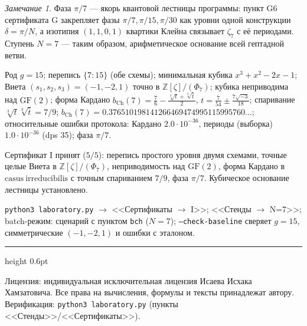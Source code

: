 \documentclass[11pt,a4paper]{article}
\theoremstyle{plain}
\theoremstyle{definition}
\theoremstyle{remark}
\newtheorem{remark}[theorem]{Замечание}
\newcommand{\ZZ}{\mathbb{Z}}
\begin{document}
\begin{remark}
Фаза $\pi/7$ --- якорь квантовой лестницы программы: пункт G6
сертификата G закрепляет фазы $\pi/7,\pi/15,\pi/30$ как уровни
одной конструкции $\delta=\pi/N$, а изотипия $(1,1,0,1)$ квартики
Клейна связывает $\zeta_7$ с её периодами. Ступень $N=7$ --- таким
образом, арифметическое основание всей гептадной ветви.
\end{remark}

\begin{databox}
Род $g=15$; перепись $\{7\colon 15\}$ (обе схемы); минимальная
кубика $x^3+x^2-2x-1$; Виета $(s_1,s_2,s_3)=(-1,-2,1)$ точно в
$\ZZ[\zeta]/(\Phi_7)$; кубика неприводима над $\mathrm{GF}(2)$;
форма Кардано
$b_{\mathrm{Ch}}(7)=\frac76-\frac{\sqrt[3]{t}+\sqrt[3]{\bar t}}{2}$,
$t=\frac{7}{54}\pm\frac{7\sqrt{-3}}{18}$; спаривание
$\sqrt[3]{t}\sqrt[3]{\bar t}=7/9$;
$b_{\mathrm{Ch}}(7)=0.376510198141266469474995115995760\ldots$;
относительные ошибки протокола: Кардано $2.0\cdot10^{-36}$,
периоды (выборка) $1.0\cdot10^{-36}$ (dps 35); фаза $\pi/7$.
\end{databox}

\begin{statusbox}[итог]
Сертификат I принят ($5/5$): перепись простого уровня двумя
схемами, точные целые Виета в $\ZZ[\zeta]/(\Phi_7)$,
неприводимость над $\mathrm{GF}(2)$, форма Кардано в
$\mathrm{casus\ irreducibilis}$ с точным спариванием $7/9$,
фаза $\pi/7$. Кубическое основание лестницы установлено.
\end{statusbox}

\begin{verifybox}
\texttt{python3 laboratory.py} $\to$ <<Сертификаты $\to$ I>>;
<<Стенды $\to$ N=7>>; batch-режим: сценарий с пунктом
\texttt{bch} ($N=7$); \texttt{--check-baseline} сверяет
$g=15$, симметрические $(-1,-2,1)$ и ошибки с эталоном.
\end{verifybox}

\vfill
{\color{linkblue}\hrule height 0.6pt}
\vspace{0.5em}
{\small\color{gray}
Лицензия: индивидуальная исключительная лицензия Исаева Исхака Хамзатовича.
Все права на вычисления, формулы и тексты принадлежат автору.
Верификация: \texttt{python3 laboratory.py} (пункты <<Стенды>>/<<Сертификаты>>).
}
\end{document}
